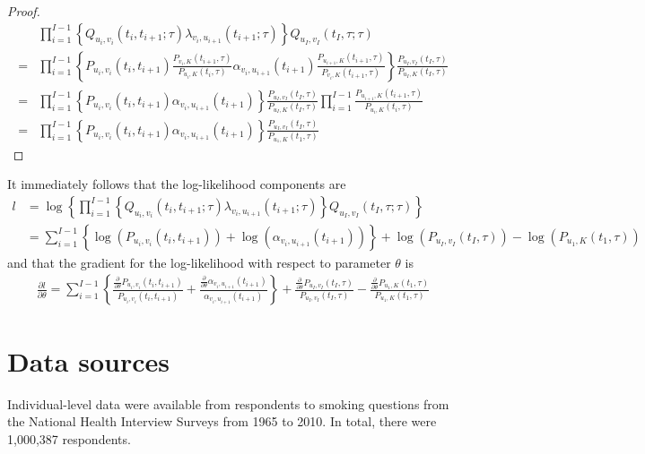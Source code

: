 \documentclass[11pt,a4paper]{article}
\newcommand{\ddTheta}{\ensuremath{\frac{\partial}{\partial\theta}}}
\begin{document}
\begin{proof}
\begin{align*} 
& \prod_{i=1}^{I-1} \left\{Q_{u_i,v_i}(t_i,t_{i+1};\tau) \lambda_{v_i,u_{i+1}}(t_{i+1};\tau)\right\}Q_{u_I,v_I}(t_I,\tau;\tau)\\
= & \prod_{i=1}^{I-1} \left\{P_{u_i,v_i}(t_i,t_{i+1})\frac{P_{v_i,K}(t_{i+1},\tau)}{P_{u_i,K}(t_{i},\tau)} \alpha_{v_i,u_{i+1}}(t_{i+1})\frac{P_{u_{i+1},K}(t_{i+1},\tau)}{P_{v_i,K}(t_{i+1},\tau)}\right\}\frac{P_{u_I,v_I}(t_I,\tau)}{P_{u_I,K}(t_{I},\tau)} \\
 = & \prod_{i=1}^{I-1} \left\{P_{u_i,v_i}(t_i,t_{i+1})\alpha_{v_i,u_{i+1}}(t_{i+1})\right\} 
\frac{P_{u_I,v_I}(t_I,\tau)}{P_{u_I,K}(t_{I},\tau)}
 \prod_{i=1}^{I-1} \frac{P_{u_{i+1},K}(t_{i+1},\tau)}{P_{u_i,K}(t_{i},\tau)} \\
 = & \prod_{i=1}^{I-1} \left\{P_{u_i,v_i}(t_i,t_{i+1})\alpha_{v_i,u_{i+1}}(t_{i+1})\right\} 
\frac{P_{u_I,v_I}(t_I,\tau)}{P_{u_1,K}(t_{1},\tau)}
\end{align*}
\end{proof} 

It immediately follows that the log-likelihood components are
\begin{align*}
l &= \log\left\{\prod_{i=1}^{I-1} \left\{Q_{u_i,v_i}(t_i,t_{i+1};\tau) \lambda_{v_i,u_{i+1}}(t_{i+1};\tau)\right\}Q_{u_I,v_I}(t_I,\tau;\tau) \right\} \\
&= \sum_{i=1}^{I-1}\left\{\log(P_{u_i,v_i}(t_i,t_{i+1}))+ \log(\alpha_{v_i,u_{i+1}}(t_{i+1}))\right\} 
+\log(P_{u_I,v_I}(t_I,\tau))-\log(P_{u_1,K}(t_{1},\tau))
\end{align*}
and that the gradient for the log-likelihood with respect to parameter $\theta$ is
\begin{align*}
\frac{\partial l}{\partial \theta} 
= \sum_{i=1}^{I-1}\left\{\frac{\ddTheta P_{u_i,v_i}(t_i,t_{i+1})}{P_{u_i,v_i}(t_i,t_{i+1})}+ \frac{\ddTheta \alpha_{v_i,u_{i+1}}(t_{i+1})}{\alpha_{v_i,u_{i+1}}(t_{i+1})}\right\} 
+\frac{\ddTheta P_{u_I,v_I}(t_I,\tau)}{P_{u_I,v_I}(t_I,\tau)}-\frac{\ddTheta P_{u_1,K}(t_{1},\tau)}{P_{u_1,K}(t_{1},\tau)}
\end{align*}

\section{Data sources}


Individual-level data were available from respondents to smoking questions from the National Health Interview Surveys from 1965 to 2010. In total, there were 1,000,387 respondents. 
\end{document}
